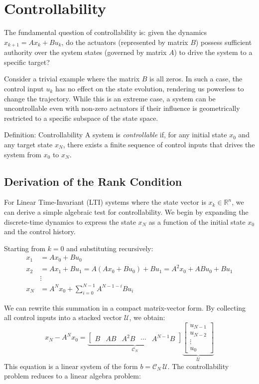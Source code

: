 \section{Controllability}

The fundamental question of controllability is: given the dynamics $x_{k+1} = A x_k + B u_k$, do the actuators (represented by matrix $B$) possess sufficient authority over the system states (governed by matrix $A$) to drive the system to a specific target?

Consider a trivial example where the matrix $B$ is all zeros. In such a case, the control input $u_k$ has no effect on the state evolution, rendering us powerless to change the trajectory. While this is an extreme case, a system can be uncontrollable even with non-zero actuators if their influence is geometrically restricted to a specific subspace of the state space.

\begin{defnbox}{Definition: Controllability}
A system is \emph{controllable} if, for any initial state $x_0$ and any target state $x_N$, there exists a finite sequence of control inputs that drives the system from $x_0$ to $x_N$.
\end{defnbox}

\subsection{Derivation of the Rank Condition}

For Linear Time-Invariant (LTI) systems where the state vector is $x_k \in \mathbb R^n$, we can derive a simple algebraic test for controllability. We begin by expanding the discrete-time dynamics to express the state $x_N$ as a function of the initial state $x_0$ and the control history.

Starting from $k=0$ and substituting recursively:
\begin{align*}
	x_1 &= A x_0 + B u_0 \\
	x_2 &= A x_1 + B u_1 = A(A x_0 + B u_0) + B u_1 = A^2 x_0 + AB u_0 + B u_1 \\
	&\vdots \\
	x_N &= A^N x_0 + \sum_{i=0}^{N-1} A^{N-1-i} B u_i
\end{align*}

We can rewrite this summation in a compact matrix-vector form. By collecting all control inputs into a stacked vector $\mathcal{U}$, we obtain:
\[
x_N - A^N x_0 = 
\underbrace{\begin{bmatrix} B & AB & A^2 B & \cdots & A^{N-1} B \end{bmatrix}}_{\mathcal{C}_N}
\underbrace{\begin{bmatrix} u_{N-1} \\ u_{N-2} \\ \vdots \\ u_0 \end{bmatrix}}_{\mathcal{U}}
\]
This equation is a linear system of the form ${b} = \mathcal{C}_N\, \mathcal{U}$. The controllability problem reduces to a linear algebra problem: 

